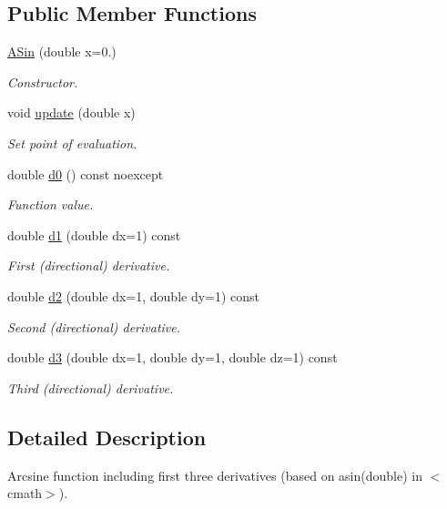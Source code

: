 \subsection*{Public Member Functions}
\begin{DoxyCompactItemize}
\item 
\hyperlink{structFunG_1_1ASin_aea477c9658dc3cea15cd77aa637b5ce4}{A\+Sin} (double x=0.)
\begin{DoxyCompactList}\small\item\em Constructor. \end{DoxyCompactList}\item 
void \hyperlink{structFunG_1_1ASin_a0c7e3aa8b532914de2068b3bc74d57f1}{update} (double x)
\begin{DoxyCompactList}\small\item\em Set point of evaluation. \end{DoxyCompactList}\item 
double \hyperlink{structFunG_1_1ASin_a9c3b2d30afbd9d258b7bf30b425f5600}{d0} () const noexcept
\begin{DoxyCompactList}\small\item\em Function value. \end{DoxyCompactList}\item 
double \hyperlink{structFunG_1_1ASin_a0468608cbecdcc4d8d5eca641232ceba}{d1} (double dx=1) const 
\begin{DoxyCompactList}\small\item\em First (directional) derivative. \end{DoxyCompactList}\item 
double \hyperlink{structFunG_1_1ASin_a3bf0627e743505d38f04e9d9132331df}{d2} (double dx=1, double dy=1) const 
\begin{DoxyCompactList}\small\item\em Second (directional) derivative. \end{DoxyCompactList}\item 
double \hyperlink{structFunG_1_1ASin_a50f2fbd6e12b64492ef63c732f0f82f1}{d3} (double dx=1, double dy=1, double dz=1) const 
\begin{DoxyCompactList}\small\item\em Third (directional) derivative. \end{DoxyCompactList}\end{DoxyCompactItemize}


\subsection{Detailed Description}
Arcsine function including first three derivatives (based on asin(double) in $<$cmath$>$). 

